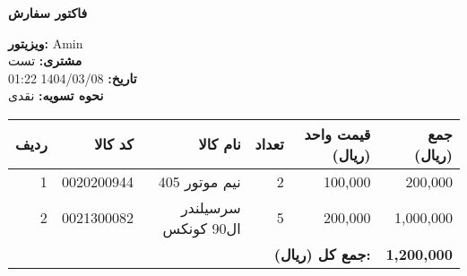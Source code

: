 \documentclass[a4paper,12pt]{article}
\begin{document}
\begin{center}
    \textbf{\Large فاکتور سفارش}
\end{center}
\vspace{0.5cm}
\begin{flushright}
    \textbf{ویزیتور:} Amin \\
    \textbf{مشتری:} تست \\
    \textbf{تاریخ:} 1404/03/08 01:22 \\
    \textbf{نحوه تسویه:} نقدی
\end{flushright}
\vspace{0.5cm}
\begin{longtable}{|r|r|r|r|r|r|}
    \hline
    \textbf{ردیف} & \textbf{کد کالا} & \textbf{نام کالا} & \textbf{تعداد} & \textbf{قیمت واحد (ریال)} & \textbf{جمع (ریال)} \\
    \hline
    \endhead
    1 & 0020200944 & نيم موتور 405 & 2 & 100,000 & 200,000 \\
    \hline
    2 & 0021300082 & سرسيلندر ال90 کونکس & 5 & 200,000 & 1,000,000 \\
    \hline
    \multicolumn{5}{|r|}{\textbf{جمع کل (ریال):}} & \textbf{1,200,000} \\
    \hline
\end{longtable}
\end{document}
